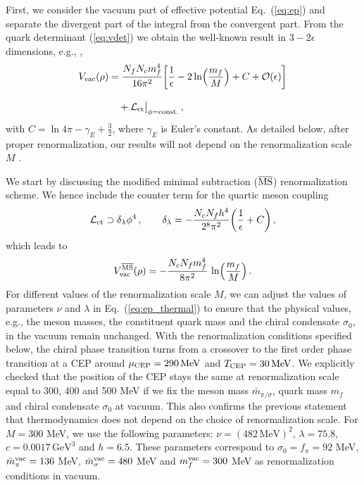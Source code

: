 \documentclass[reprint,english,superscriptaddress,preprintnumbers,amsmath,amssymb,aps,prd]{revtex4-2}
\def\eq#1{(\ref{#1})}
\def\Eq#1{Eq.~(\ref{#1})}
\begin{document}
First, we consider the vacuum part of effective potential \Eq{eq:ep} and separate the divergent part of the integral from the convergent part. From the quark determinant \eq{eq:vdet} we obtain the well-known result in $3-2\epsilon$ dimensions, e.g., \cite{Skokov:2010sf, Mukherjee:2021tyg},
%
\begin{align}
\begin{split}
V_{\mathrm{vac}}(\rho) &= \frac{N_f N_c m_f^4}{16 \pi^2}\bigg[\frac{1}{\epsilon}-2 \ln\!\Big(\frac{m_f}{M}\Big)+C + \mathcal{O}(\epsilon)\bigg]\\[2ex]
&\quad + \mathcal{L}_{\rm ct}\big|_{\phi = {\rm const.}}\,,
\end{split}
\end{align}
%
with $C = \ln 4\pi-\gamma_E + \frac{3}{2}$, where $\gamma_E$ is Euler's constant. As detailed below, after proper renormalization, our results will not depend on the renormalization scale $M$ \cite{Skokov:2010sf}. 


We start by discussing the modified minimal subtraction ($\overline{\rm MS}$) renormalization scheme. We hence include the counter term for the quartic meson coupling
\begin{align}\label{eq:ctV}
    \mathcal{L}_{\rm ct} \supset \delta_\lambda \phi^4\,,\qquad \delta_\lambda = -\frac{N_c N_f h^4}{2^8 \pi^2} \bigg(\frac{1}{\epsilon} + C \bigg)\,,
\end{align}
which leads to
%
\begin{align}
V^{\overline{{\rm MS}}}_{\mathrm{vac}}(\rho)=-\frac{N_cN_fm_f^4}{8\pi^2}\,\ln\!\Big(\frac{m_f}{M}\Big)\,.
\label{eq:ep_re}
\end{align}
%
For different values of the renormalization scale $M$, we can adjust the values of parameters $\nu$ and $\lambda$ in \Eq{eq:ep_thermal} to ensure that the physical values, e.g., the meson masses, the constituent quark mass and the chiral condensate $\sigma_0$, in the vacuum remain unchanged. With the renormalization conditions specified below, the chiral phase transition turns from a crossover to the first order phase transition at a CEP around $\mu_{\rm CEP}=290\,\mathrm{MeV}$ and $T_{\rm CEP} = 30\,\mathrm{MeV}$. We explicitly checked that the position of the CEP stays the same at renormalization scale equal to 300, 400 and 500 MeV if we fix the meson mass $\bar m_{\pi/\sigma}$, quark mass $m_f$ and chiral condensate $\sigma_0$ at vacuum. This also confirms the previous statement that thermodynamics does not depend on the choice of renormalization scale. For $M=300$ MeV, we use the following parameters: $\nu=(482\,\mathrm{MeV})^2$, $\lambda=75.8$, $c=0.0017\,\mathrm{GeV}^3$ and $h=6.5$. These parameters correspond to $\sigma_0 = f_\pi =92$ MeV, $\bar m_\pi^{\rm vac}=136$ MeV, $\bar m_\sigma^{\rm vac}=480$ MeV and $m_f^{\rm vac}=300$ MeV as renormalization conditions in vacuum. 
\end{document}
